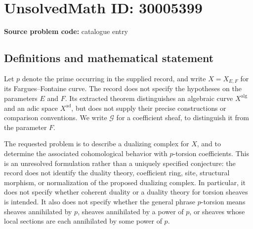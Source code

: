 \documentclass[11pt]{article}
\begin{document}
\section*{UnsolvedMath ID: 30005399}
\textbf{Source problem code:} catalogue entry
\subsection{Definitions and mathematical statement}
Let \(p\) denote the prime occurring in the supplied record, and write \(X=X_{E,F}\) for its Fargues--Fontaine curve. The record does not specify the hypotheses on the parameters \(E\) and \(F\). Its extracted theorem distinguishes an algebraic curve \(X^{\mathrm{alg}}\) and an adic space \(X^{\mathrm{ad}}\), but does not supply their precise constructions or comparison conventions. We write \(\mathcal G\) for a coefficient sheaf, to distinguish it from the parameter \(F\).

The requested problem is to describe a dualizing complex for \(X\), and to determine the associated cohomological behavior with \(p\)-torsion coefficients. This is an unresolved formulation rather than a uniquely specified conjecture: the record does not identify the duality theory, coefficient ring, site, structural morphism, or normalization of the proposed dualizing complex. In particular, it does not specify whether coherent duality or a duality theory for torsion sheaves is intended. It also does not specify whether the general phrase \(p\)-torsion means sheaves annihilated by \(p\), sheaves annihilated by a power of \(p\), or sheaves whose local sections are each annihilated by some power of \(p\).
\end{document}
